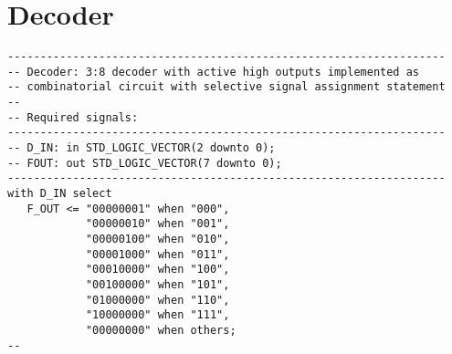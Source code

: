 \section{Decoder}
\noindent
\begin{minipage}{1\linewidth}
\begin{lstlisting}
-------------------------------------------------------------------
-- Decoder: 3:8 decoder with active high outputs implemented as
-- combinatorial circuit with selective signal assignment statement
--
-- Required signals: 
-------------------------------------------------------------------
-- D_IN: in STD_LOGIC_VECTOR(2 downto 0); 
-- FOUT: out STD_LOGIC_VECTOR(7 downto 0); 
-------------------------------------------------------------------
with D_IN select
   F_OUT <= "00000001" when "000",
            "00000010" when "001",
            "00000100" when "010",
            "00001000" when "011",
            "00010000" when "100",
            "00100000" when "101",
            "01000000" when "110",
            "10000000" when "111",
            "00000000" when others;
--
\end{lstlisting}
\end{minipage}














